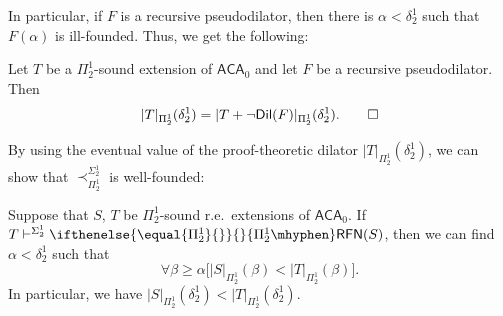 \documentclass{mhkr}
\newcommand{\added}[1]{#1}
\newcommand{\Dil}{\mathsf{Dil}}
\newcommand{\RFN}[1][]{\ifthenelse{\equal{#1}{}}{}{#1\mhyphen}\mathsf{RFN}}
\newcommand{\ACA}{\mathsf{ACA}}
\begin{document}
\added{In particular}, if $F$ is a recursive pseudodilator, then there is $\alpha<\delta^1_2$ such that $F(\alpha)$ is ill-founded. Thus, we get the following:
\begin{corollary} \pushQED{\qed}
    Let $T$ be a $\Pi^1_2$-sound extension of $\ACA_0$ and let $F$ be a recursive pseudodilator. Then
    \begin{equation*}
        |T|_{\Pi^1_2}(\delta^1_2) = |T+\lnot\Dil(F)|_{\Pi^1_2}(\delta^1_2). \qedhere 
    \end{equation*}
\end{corollary}

By using the eventual value of the proof-theoretic dilator $|T|_{\Pi^1_2}(\delta^1_2)$, we can show that $\prec^{\Sigma^1_2}_{\Pi^1_2}$ is well-founded:
\begin{lemma}
    Suppose that $S$, $T$ be $\Pi^1_2$-sound r.e.\ extensions of $\ACA_0$. If $T\vdash^{\Sigma^1_2} \RFN[\Pi^1_2](S)$, then we can find $\alpha<\delta^1_2$ such that 
    \begin{equation*}
        \forall \beta\ge\alpha \bigl[|S|_{\Pi^1_2}(\beta) < |T|_{\Pi^1_2}(\beta)\bigr].
    \end{equation*}
    \added{In particular}, we have $|S|_{\Pi^1_2}(\delta^1_2) < |T|_{\Pi^1_2}(\delta^1_2)$.
\end{lemma}
\end{document}
